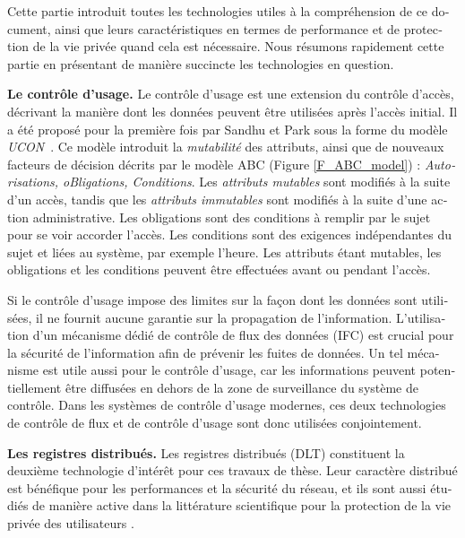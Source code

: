 \begin{otherlanguage}{french}
Cette partie introduit toutes les technologies utiles à la compréhension de ce document, ainsi que leurs caractéristiques en termes de performance et de protection de la vie privée quand cela est nécessaire. Nous résumons rapidement cette partie en présentant de manière succincte les technologies en question.

\textbf{Le contrôle d'usage.} 
Le contrôle d'usage est une extension du contrôle d'accès, décrivant la manière dont les données peuvent être utilisées après l'accès initial. Il a été proposé pour la première fois par Sandhu et Park sous la forme du modèle \emph{UCON}~\cite{Park2004}. Ce modèle introduit la \emph{mutabilité} des attributs, ainsi que de nouveaux facteurs de décision décrits par le modèle ABC (Figure \ref{F_ABC_model}) : \emph{Autorisations, oBligations, Conditions}. Les \emph{attributs mutables} sont modifiés à la suite d'un accès, tandis que les \emph{attributs immutables} sont modifiés à la suite d'une action administrative. Les obligations sont des conditions à remplir par le sujet pour se voir accorder l'accès. Les conditions sont des exigences indépendantes du sujet et liées au système, par exemple l'heure. Les attributs étant mutables, les obligations et les conditions peuvent
être effectuées avant ou pendant l'accès.


Si le contrôle d'usage impose des limites sur la façon dont les données sont utilisées, il ne fournit aucune garantie sur la propagation de l'information. L'utilisation d'un mécanisme dédié de contrôle de flux des données (IFC) est crucial pour la sécurité de l'information afin de prévenir les fuites de données. Un tel mécanisme est utile aussi pour le contrôle d'usage, car les informations peuvent potentiellement être diffusées en dehors de la zone de surveillance du système de contrôle. Dans les systèmes de contrôle d'usage modernes, ces deux technologies de contrôle de flux et de contrôle d’usage sont donc utilisées conjointement.

\textbf{Les registres distribués.} Les registres distribués (DLT) constituent la deuxième technologie d'intérêt pour ces travaux de thèse. Leur caractère distribué est bénéfique pour les performances et la sécurité du réseau, et ils sont aussi étudiés de manière active dans la littérature scientifique pour la protection de la vie privée des utilisateurs \cite{Rifi2017, Zhaofeng2021, Goyat2022, Rajasekaran2023, Bao2023}.


\end{otherlanguage}
